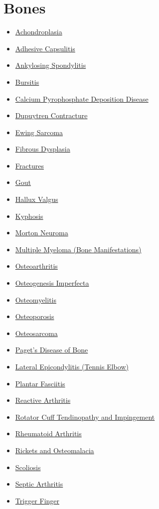 \section*{Bones}
\label{sec:organ_bones}
\begin{itemize}[noitemsep]
  \item \hyperlink{sec:Achondroplasia}{Achondroplasia}
  \item \hyperlink{sec:Adhesive Capsulitis}{Adhesive Capsulitis}
  \item \hyperlink{sec:Ankylosing Spondylitis}{Ankylosing Spondylitis}
  \item \hyperlink{sec:Bursitis}{Bursitis}
  \item \hyperlink{sec:Calcium Pyrophosphate Deposition Disease}{Calcium Pyrophosphate Deposition Disease}
  \item \hyperlink{sec:Dupuytren Contracture}{Dupuytren Contracture}
  \item \hyperlink{sec:Ewing Sarcoma}{Ewing Sarcoma}
  \item \hyperlink{sec:Fibrous Dysplasia}{Fibrous Dysplasia}
  \item \hyperlink{sec:Fractures}{Fractures}
  \item \hyperlink{sec:Gout}{Gout}
  \item \hyperlink{sec:Hallux Valgus}{Hallux Valgus}
  \item \hyperlink{sec:Kyphosis}{Kyphosis}
  \item \hyperlink{sec:Morton Neuroma}{Morton Neuroma}
  \item \hyperlink{sec:Multiple Myeloma (Bone Manifestations)}{Multiple Myeloma (Bone Manifestations)}
  \item \hyperlink{sec:Osteoarthritis}{Osteoarthritis}
  \item \hyperlink{sec:Osteogenesis Imperfecta}{Osteogenesis Imperfecta}
  \item \hyperlink{sec:Osteomyelitis}{Osteomyelitis}
  \item \hyperlink{sec:Osteoporosis}{Osteoporosis}
  \item \hyperlink{sec:Osteosarcoma}{Osteosarcoma}
  \item \hyperlink{sec:Paget's Disease of Bone}{Paget's Disease of Bone}
  \item \hyperlink{sec:Lateral Epicondylitis (Tennis Elbow)}{Lateral Epicondylitis (Tennis Elbow)}
  \item \hyperlink{sec:Plantar Fasciitis}{Plantar Fasciitis}
  \item \hyperlink{sec:Reactive Arthritis}{Reactive Arthritis}
  \item \hyperlink{sec:Rotator Cuff Tendinopathy and Impingement}{Rotator Cuff Tendinopathy and Impingement}
  \item \hyperlink{sec:Rheumatoid Arthritis}{Rheumatoid Arthritis}
  \item \hyperlink{sec:Rickets and Osteomalacia}{Rickets and Osteomalacia}
  \item \hyperlink{sec:Scoliosis}{Scoliosis}
  \item \hyperlink{sec:Septic Arthritis}{Septic Arthritis}
  \item \hyperlink{sec:Trigger Finger}{Trigger Finger}
\end{itemize}

